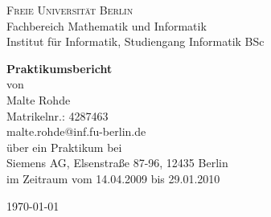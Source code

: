 \documentclass[a4paper,10pt]{scrartcl}
\begin{document}
\begin{titlepage}
       
\begin{center}

\textsc{\Large Freie Universität Berlin}\\
{\large Fachbereich Mathematik und Informatik\\Institut für Informatik, Studiengang Informatik BSc}

\vspace*{1.2cm}

{ \huge \bfseries Praktikumsbericht}\\[0.7cm]
{\large
von\\[0.2cm]
Malte Rohde\\
Matrikelnr.: 4287463\\
malte.rohde@inf.fu-berlin.de
\\[1.0cm]
über ein Praktikum bei\\[0.2cm]
Siemens AG, Elsenstraße 87-96, 12435 Berlin\\
im Zeitraum vom 14.04.2009 bis 29.01.2010
}
\vfill

{\large \today}

\end{center}
\end{titlepage}

\newpage
\tableofcontents

\newpage








\end{document}
